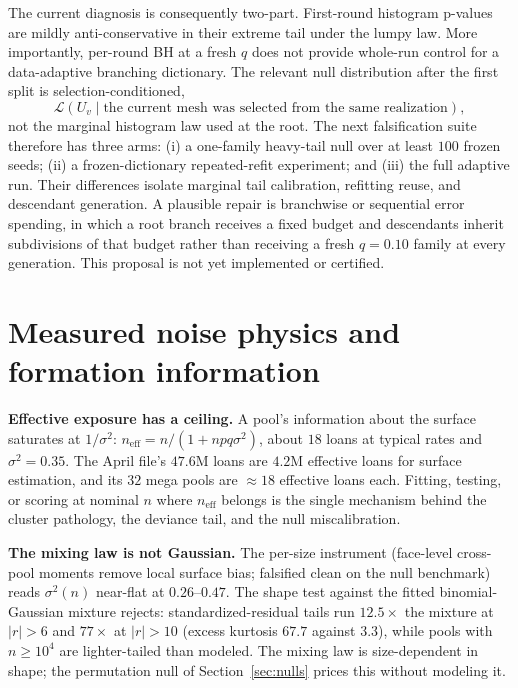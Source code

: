 \documentclass[11pt]{article}
\begin{document}
The current diagnosis is consequently two-part.  First-round histogram p-values are mildly
anti-conservative in their extreme tail under the lumpy law.  More importantly, per-round BH at a
fresh $q$ does not provide whole-run control for a data-adaptive branching dictionary.  The relevant
null distribution after the first split is selection-conditioned,
\[
 \mathcal L(U_v\mid\text{the current mesh was selected from the same realization}),
\]
not the marginal histogram law used at the root.  The next falsification suite therefore has three
arms: (i) a one-family heavy-tail null over at least $100$ frozen seeds; (ii) a frozen-dictionary
repeated-refit experiment; and (iii) the full adaptive run.  Their differences isolate marginal tail
calibration, refitting reuse, and descendant generation.  A plausible repair is branchwise or
sequential error spending, in which a root branch receives a fixed budget and descendants inherit
subdivisions of that budget rather than receiving a fresh $q=0.10$ family at every generation.  This
proposal is not yet implemented or certified.

\section{Measured noise physics and formation information}\label{sec:physics}

\textbf{Effective exposure has a ceiling.} A pool's information about the
surface saturates at $1/\sigma^2$: $n_{\mathrm{eff}} = n/(1+npq\sigma^2)$,
about $18$ loans at typical rates and $\sigma^2=0.35$. The April file's
$47.6$M loans are $4.2$M effective loans for surface estimation, and its
$32$ mega pools are ${\approx}18$ effective loans each. Fitting, testing,
or scoring at nominal $n$ where $n_{\mathrm{eff}}$ belongs is the single
mechanism behind the cluster pathology, the deviance tail, and the null
miscalibration.

\textbf{The mixing law is not Gaussian.} The per-size instrument
(face-level cross-pool moments remove local surface bias; falsified clean
on the null benchmark) reads $\sigma^2(n)$ near-flat at $0.26$--$0.47$.
The shape test against the fitted binomial-Gaussian mixture rejects:
standardized-residual tails run $12.5\times$ the mixture at $|r|>6$ and
$77\times$ at $|r|>10$ (excess kurtosis $67.7$ against $3.3$), while pools
with $n\ge10^4$ are lighter-tailed than modeled. The mixing law is
size-dependent in shape; the permutation null of
Section~\ref{sec:nulls} prices this without modeling it.
\end{document}
